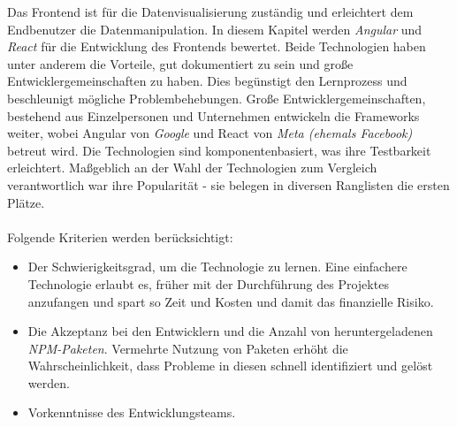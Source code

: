 Das Frontend ist für die Datenvisualisierung zuständig und erleichtert dem Endbenutzer die Datenmanipulation. In diesem Kapitel werden \textit{Angular} und \textit{React} für die Entwicklung des Frontends bewertet. Beide Technologien haben unter anderem die Vorteile, gut dokumentiert zu sein und große Entwicklergemeinschaften zu haben\cite{SO01}. Dies begünstigt den Lernprozess und beschleunigt mögliche Problembehebungen. Große Entwicklergemeinschaften, bestehend aus Einzelpersonen und Unternehmen entwickeln die Frameworks weiter, wobei Angular von \textit{Google} und React von \textit{Meta (ehemals Facebook)} betreut wird. Die Technologien sind komponentenbasiert, was ihre Testbarkeit erleichtert. Maßgeblich an der Wahl der Technologien zum Vergleich verantwortlich war ihre Popularität - sie belegen in diversen Ranglisten die ersten Plätze\cite{SO01}.
\\\\
Folgende Kriterien werden berücksichtigt:
\begin{itemize}
  \item
        Der Schwierigkeitsgrad, um die Technologie zu lernen. Eine einfachere Technologie erlaubt es, früher mit der Durchführung des Projektes anzufangen und spart so Zeit und Kosten und damit das finanzielle Risiko.
  \item
        Die Akzeptanz bei den Entwicklern und die Anzahl von heruntergeladenen \textit{NPM-Paketen}. Vermehrte Nutzung von Paketen erhöht die Wahrscheinlichkeit, dass Probleme in diesen schnell identifiziert und gelöst werden\cite{LIN1}.
  \item
        Vorkenntnisse des Entwicklungsteams.

\end{itemize}


